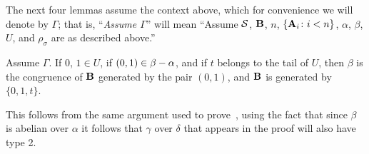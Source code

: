 The next four lemmas assume the context above, which for convenience
we will denote by $\Gamma$; that is,
``\emph{Assume $\Gamma$}'' will mean ``Assume $\mathcal{S}$, $\mathbf{B}$, $n$, $\{\mathbf{A}_i \colon i < n\}$,
$\alpha$, $\beta$, $U$, and $\rho_\sigma$ are as described above.''


\begin{lemma}
\label{lem:fv_3-1}
Assume $\Gamma$. If\/ $0$, $1 \in U$, if $(0,1) \in \beta - \alpha$, and if
$t$ belongs to the tail of $U$, then $\beta$ is the congruence of $\mathbf{B}$
generated by the pair $(0,1)$, and $\mathbf{B}$ is generated by $\{0, 1, t\}$.
\end{lemma}
This follows from the same argument used to prove~\cite[Lemma~3.1]{Freese:2009}, using the fact that since $\beta$ is abelian over $\alpha$ it follows that $\gamma$ over $\delta$ that appears in the proof will also have type 2.


